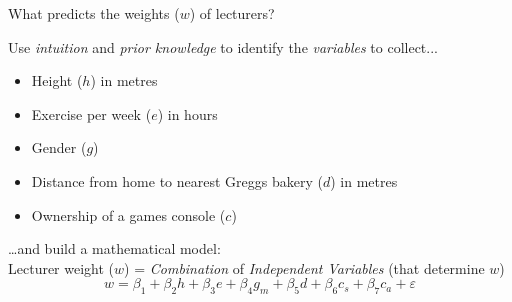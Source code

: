 \documentclass[xcolor=x11names,handout,compress]{beamer}
\renewcommand{\(}{\begin{columns}}
\renewcommand{\)}{\end{columns}}
\newcommand{\<}[1]{\begin{column}{#1}}
\renewcommand{\>}{\end{column}}
\begin{document}
  \begin{frame}{What predicts the weights ($w$) of lecturers?}
  
  Use {\it intuition} and {\it prior knowledge} to identify the {\it variables} to collect...
  \begin{itemize}[<+->]
  
      \item Height ($h$) in metres
      \item Exercise per week ($e$) in hours
      \item Gender ($g$)
      \item Distance from home to nearest Greggs bakery ($d$) in metres
      \item Ownership of a games console ($c$)
  
  \pause
  \end{itemize}
  \vspace{12pt}
  \ldots and build a mathematical model:\\
  \vspace{6pt}
  Lecturer weight ($w$) = {\it Combination} of {\it Independent Variables} (that determine $w$)
  \pause
  $$w = \beta_1 + \beta_2 h + \beta_3 e + \beta_4 g_m  + \beta_5 d + \beta_6 c_s + \beta_7 c_a + \varepsilon$$
  
\end{frame}
\end{document}
